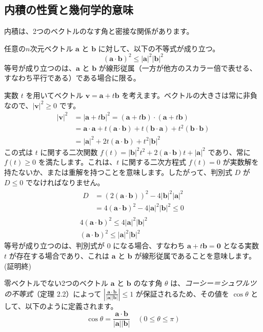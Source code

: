 \subsection{内積の性質と幾何学的意味}
内積は、2つのベクトルのなす角と密接な関係があります。
\begin{thm}
任意の$n$次元ベクトル $\bm{a}$ と $\bm{b}$ に対して、以下の不等式が成り立つ。
\[(\bm{a} \cdot \bm{b})^2 \le |\bm{a}|^2 |\bm{b}|^2\]
等号が成り立つのは、$\bm{a}$ と $\bm{b}$ が線形従属（一方が他方のスカラー倍で表せる、すなわち平行である）である場合に限る。
\begin{proof*}
実数 $t$ を用いてベクトル $\bm{v} = \bm{a} + t\bm{b}$ を考えます。ベクトルの大きさは常に非負なので、$|\bm{v}|^2 \ge 0$ です。
\begin{align*}
|\bm{v}|^2 &= |\bm{a} + t\bm{b}|^2 = (\bm{a} + t\bm{b}) \cdot (\bm{a} + t\bm{b})\\
&= \bm{a} \cdot \bm{a} + t(\bm{a} \cdot \bm{b}) + t(\bm{b} \cdot \bm{a}) + t^2(\bm{b} \cdot \bm{b})\\
&= |\bm{a}|^2 + 2t(\bm{a} \cdot \bm{b}) + t^2|\bm{b}|^2
\end{align*}
この式は $t$ に関する二次関数 $f(t) = |\bm{b}|^2 t^2 + 2(\bm{a} \cdot \bm{b}) t + |\bm{a}|^2$ であり、常に $f(t) \ge 0$ を満たします。これは、$t$ に関する二次方程式 $f(t) = 0$ が実数解を持たないか、または重解を持つことを意味します。したがって、判別式 $D$ が $D \le 0$ でなければなりません。
\begin{gather*}
\begin{aligned}
D &= (2(\bm{a} \cdot \bm{b}))^2 - 4|\bm{b}|^2 |\bm{a}|^2\\
&= 4(\bm{a} \cdot \bm{b})^2 - 4|\bm{a}|^2 |\bm{b}|^2 \le 0
\end{aligned}\\
4(\bm{a} \cdot \bm{b})^2 \le 4|\bm{a}|^2 |\bm{b}|^2\\
(\bm{a} \cdot \bm{b})^2 \le |\bm{a}|^2 |\bm{b}|^2
\end{gather*}
等号が成り立つのは、判別式が $0$ になる場合、すなわち $\bm{a} + t\bm{b} = \bm{0}$ となる実数 $t$ が存在する場合であり、これは $\bm{a}$ と $\bm{b}$ が線形従属であることを意味します。
(証明終)
\end{proof*}
\end{thm}
\begin{dfn}
零ベクトルでない2つのベクトル $\bm{a}$ と $\bm{b}$ のなす角 $\theta$ は、\emph{コーシー＝シュワルツの不等式}（定理 2.2）によって $\left| \frac{\bm{a} \cdot \bm{b}}{|\bm{a}| |\bm{b}|} \right| \le 1$ が保証されるため、その値を $\cos\theta$ として、以下のように定義されます。
\[\cos\theta = \frac{\bm{a} \cdot \bm{b}}{|\bm{a}| |\bm{b}|} \quad (0 \le \theta \le \pi)\]
\end{dfn}
